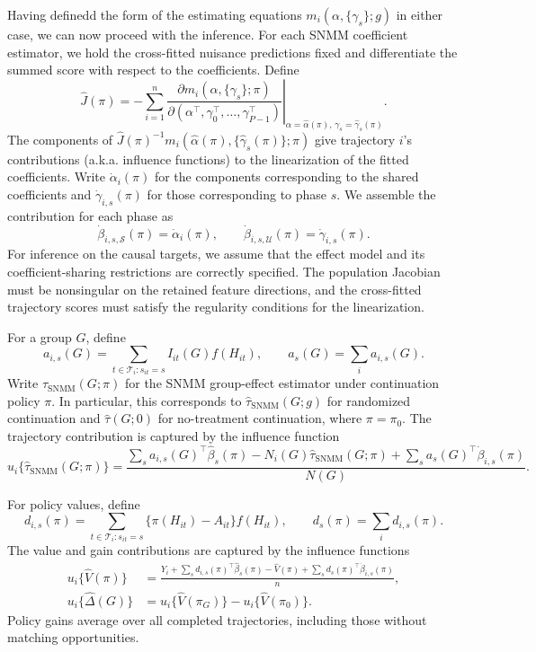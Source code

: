 Having definedd the form of the estimating equations $m_i(\alpha,\{\gamma_s\};g)$ in either case, we can now proceed with the inference. For each SNMM coefficient estimator, we hold the cross-fitted nuisance predictions
fixed and differentiate the summed score with respect to the
coefficients. Define
\[
 \widehat J(\pi)
   =-\sum_{i=1}^n
     \left.
       \frac{\partial m_i(\alpha,\{\gamma_s\};\pi)}
       {\partial(\alpha^\top,\gamma_0^\top,\ldots,\gamma_{P-1}^\top)}
     \right|_{\alpha=\widehat\alpha(\pi),\,\gamma_s=\widehat\gamma_s(\pi)}.
\]
The components of
$\widehat J(\pi)^{-1}m_i(\widehat\alpha(\pi),\{\widehat\gamma_s(\pi)\};\pi)$
give trajectory $i$'s contributions (a.k.a. influence functions) to the linearization of
the fitted coefficients. Write $\dot\alpha_i(\pi)$ for the
components corresponding to the shared coefficients and
$\dot\gamma_{i,s}(\pi)$ for those corresponding to phase $s$.
We assemble the contribution for each phase as
\[
 \dot\beta_{i,s,\mathcal S}(\pi)=\dot\alpha_i(\pi),\qquad
 \dot\beta_{i,s,\mathcal U}(\pi)=\dot\gamma_{i,s}(\pi).
\]
For inference on the causal targets, we assume that the effect
model and its coefficient-sharing restrictions are correctly
specified. The population Jacobian must be nonsingular on the
retained feature directions, and the cross-fitted trajectory
scores must satisfy the regularity conditions for the
linearization.




For a group $G$, define
\[
 a_{i,s}(G)
   =\sum_{t\in\mathcal T_i:s_{it}=s}I_{it}(G)f(H_{it}),
 \qquad
 a_s(G)=\sum_i a_{i,s}(G).
\]
Write $\widehat\tau_{\mathrm{SNMM}}(G;\pi)$ for the SNMM group-effect
estimator under continuation policy $\pi$.
In particular, this corresponds to $\widehat\tau_{\mathrm{SNMM}}(G;g)$
for randomized continuation and $\widehat\tau(G;0)$ for no-treatment
continuation, where $\pi=\pi_0$.
The trajectory contribution is captured by the influence function
\begin{equation}
 u_i\{\widehat\tau_{\mathrm{SNMM}}(G;\pi)\}
   =\frac{
      \sum_s a_{i,s}(G)^\top\widehat\beta_s(\pi)
      -N_i(G)\widehat\tau_{\mathrm{SNMM}}(G;\pi)
      +\sum_s a_s(G)^\top\dot\beta_{i,s}(\pi)
     }{N(G)}.
 \label{eq:blip-influence}
\end{equation}

For policy values, define
\[
 d_{i,s}(\pi)
   =\sum_{t\in\mathcal T_i:s_{it}=s}
      \{\pi(H_{it})-A_{it}\}f(H_{it}),
 \qquad
 d_s(\pi)=\sum_i d_{i,s}(\pi).
\]
The value and gain contributions are captured by the influence functions
\begin{equation}
\begin{aligned}
 u_i\{\widehat V(\pi)\}
   &=\frac{
       Y_i+\sum_s d_{i,s}(\pi)^\top\widehat\beta_s(\pi)
       -\widehat V(\pi)
       +\sum_s d_s(\pi)^\top\dot\beta_{i,s}(\pi)
      }{n},\\
 u_i\{\widehat\Delta(G)\}
   &=u_i\{\widehat V(\pi_G)\}
     -u_i\{\widehat V(\pi_0)\}.
\end{aligned}
\label{eq:value-influence}
\end{equation}
Policy gains average over all completed trajectories, including those
without matching opportunities.

